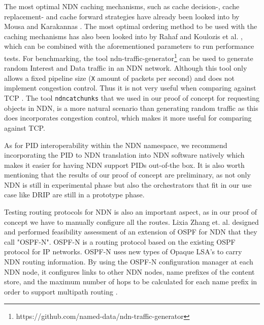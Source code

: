 The most optimal NDN caching mechanisms, such as cache decision-, cache replacement- and cache forward strategies have already been looked into by Mousa \cite{ndn-app-aware} and Karakannas \cite{icn-bd}. The most optimal ordering method to be used with the caching mechanisms has also been looked into by Rahaf and Koulozis et al. \cite{koulouzis2018information}, which can be combined with the aforementioned parameters to run performance tests.
For benchmarking, the tool ndn-traffic-generator\footnote{https://github.com/named-data/ndn-traffic-generator} can be used to generate random Interest and Data traffic in an NDN network. Although this tool only allows a fixed pipeline size (\texttt{X} amount of packets per second) and does not implement congestion control. Thus it is not very useful when comparing against TCP \cite{ndnput-mem}. The tool \texttt{ndncatchunks} that we used in our proof of concept for requesting objects in NDN, is a more natural scenario than generating random traffic as this does incorporates congestion control, which makes it more useful for comparing against TCP.

As for PID interoperability within the NDN namespace, we recommend incorporating the PID to NDN translation into NDN software natively which makes it easier for having NDN support PIDs out-of-the box. It is also worth mentioning that the results of our proof of concept are preliminary, as not only NDN is still in experimental phase but also the orchestrators that fit in our use case like DRIP are still in a prototype phase.
 
 
Testing routing protocols for NDN is also an important aspect, as in our proof of concept we have to manually configure all the routes. Lixia Zhang et. al. designed and performed feasibility assessment of an extension of OSPF for NDN that they call "OSPF-N". OSPF-N is a routing protocol based on the existing OSPF protocol for IP networks. OSPF-N uses new types of Opaque LSA's to carry NDN routing information. By using the OSPF-N configuration manager at each NDN node, it configures links to other NDN nodes, name prefixes of the content store, and the maximum number of hops to be calculated for each name prefix in order to support multipath routing \cite{ndn-ospfn}.
 



